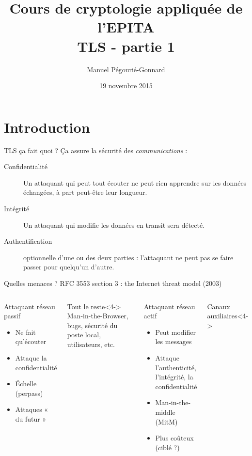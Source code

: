 \documentclass{mpg-ep-slides}
\author[MPG]{Manuel Pégourié-Gonnard}
\institute[ARM]{\normalsize ARM France - IoT - mbed TLS}
\title{Cours de cryptologie appliquée de l'EPITA \\ TLS - partie 1}
\date{19 novembre 2015}
\begin{document}
\lictitle

\section{Introduction}
\tocsect

\begin{frame}{TLS ça fait quoi ?}
  Ça assure la sécurité des \emph{communications} :
  \begin{description}
    \item[Confidentialité] Un attaquant qui peut tout écouter ne peut rien
      apprendre sur les données échangées, à part peut-être leur longueur.
    \item[Intégrité] Un attaquant qui modifie les données en transit sera
      détecté.
    \item[Authentification] optionnelle d'une ou des deux parties :
      l'attaquant ne peut pas se faire passer pour quelqu'un d'autre.
  \end{description}
\end{frame}

\begin{frame}{Quelles menaces ?}
  RFC 3553 section 3 : the Internet threat model (2003)

  \begin{columns}
    \begin{block}{Attaquant réseau passif}
      \begin{itemize}
        \item Ne fait qu'écouter
        \item Attaque la confidentialité
        \item<2-> Échelle (perpass)
        \item<3-> Attaques « du futur »
      \end{itemize}
    \end{block}

    \begin{block}{Tout le reste}<4->
      Man-in-the-Browser, bugs, sécurité du poste local, utilisateurs, etc.
    \end{block}

    \begin{block}{Attaquant réseau actif}
      \begin{itemize}
        \item Peut modifier les messages
        \item Attaque l'authenticité, l'intégrité, la confidentialité
        \item Man-in-the-middle (MitM)
        \item<2-> Plus coûteux (ciblé ?)
      \end{itemize}
    \end{block}

    \begin{block}{Canaux auxiliaires}<4->
    \end{block}
  \end{columns}
\end{frame}
\end{document}
